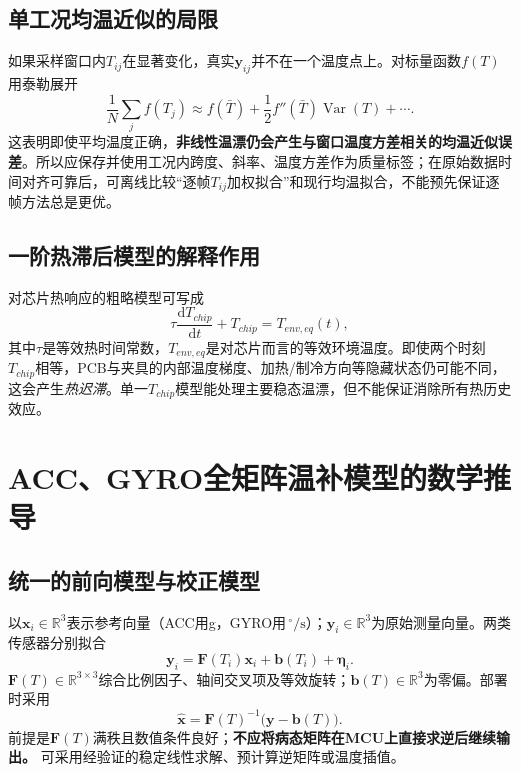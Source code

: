 \documentclass[UTF8,a4paper,11pt,oneside,openany,fontset=none]{ctexbook}
\newcommand{\vct}[1]{\bm{#1}}
\newcommand{\mat}[1]{\mathbf{#1}}
\newcommand{\R}{\mathbb{R}}
\newcommand{\dd}{\mathrm{d}}
\newcommand{\dps}{\,^{\circ}/\mathrm s}
\begin{document}
\section{单工况均温近似的局限}
如果采样窗口内$T_{ij}$在显著变化，真实$\vct y_{ij}$并不在一个温度点上。对标量函数$f(T)$用泰勒展开
\begin{equation}
\frac1N\sum_j f(T_j)\approx f(\bar T)+\frac12 f''(\bar T)\operatorname{Var}(T)+\cdots.
\end{equation}
这表明即使平均温度正确，\textbf{非线性温漂仍会产生与窗口温度方差相关的均温近似误差}。所以应保存并使用工况内跨度、斜率、温度方差作为质量标签；在原始数据时间对齐可靠后，可离线比较“逐帧$T_{ij}$加权拟合”和现行均温拟合，不能预先保证逐帧方法总是更优。

\section{一阶热滞后模型的解释作用}
对芯片热响应的粗略模型可写成
\begin{equation}\tau\frac{\dd T_{chip}}{\dd t}+T_{chip}=T_{env,eq}(t),\end{equation}
其中$\tau$是等效热时间常数，$T_{env,eq}$是对芯片而言的等效环境温度。即使两个时刻$T_{chip}$相等，PCB与夹具的内部温度梯度、加热/制冷方向等隐藏状态仍可能不同，这会产生\emph{热迟滞}。单一$T_{chip}$模型能处理主要稳态温漂，但不能保证消除所有热历史效应。

\chapter{ACC、GYRO全矩阵温补模型的数学推导}
\section{统一的前向模型与校正模型}
以$\vct x_i\in\R^3$表示参考向量（ACC用g，GYRO用$\dps$）；$\vct y_i\in\R^3$为原始测量向量。两类传感器分别拟合
\begin{equation}\label{eq:forward}\boxed{\vct y_i=\mat F(T_i)\vct x_i+\vct b(T_i)+\vct\eta_i.}\end{equation}
$\mat F(T)\in\R^{3\times3}$综合比例因子、轴间交叉项及等效旋转；$\vct b(T)\in\R^3$为零偏。部署时采用
\begin{equation}\label{eq:inverse}\boxed{\hat{\vct{x}}=\mat F(T)^{-1}\bigl(\vct y-\vct b(T)\bigr).}\end{equation}
前提是$\mat F(T)$满秩且数值条件良好；\textbf{不应将病态矩阵在MCU上直接求逆后继续输出。} 可采用经验证的稳定线性求解、预计算逆矩阵或温度插值。
\end{document}
